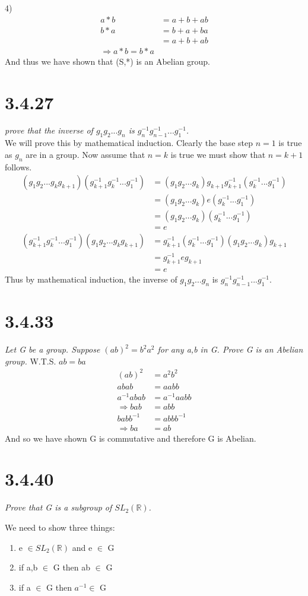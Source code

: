 \documentclass[a4paper, 11pt]{article}
\begin{document}
4)
\begin{align*}
	a \ast b &= a + b +ab \\ 
	b \ast a &= b + a +ba \\ 
	&= a + b +ab \\
	\Rightarrow a \ast b = b \ast a
\end{align*}
And thus we have shown that (S,*) is an Abelian group. 

\section*{3.4.27}
\textit{prove that the inverse of $g_1g_2...g_n$ is $g_n^{-1}g_{n-1}^{-1}...g_1^{-1}$.}\\

\noindent We will prove this by mathematical induction. Clearly the base step $n=1$ is true as $g_n$ are in a group. Now assume that $n=k$ is true we must show that $n=k+1$ follows. 
\begin{align*}
	(g_1g_2...g_kg_{k+1})(g_{k+1}^{-1}g_k^{-1}...g_1^{-1}) &=(g_1g_2...g_k)g_{k+1}g_{k+1}^{-1}(g_k^{-1}...g_1^{-1})\\
	&=(g_1g_2...g_k)e(g_k^{-1}...g_1^{-1})\\
	&=(g_1g_2...g_k)(g_k^{-1}...g_1^{-1})\\
	&= e \\
	(g_{k+1}^{-1}g_k^{-1}...g_1^{-1})(g_1g_2...g_kg_{k+1}) &=g_{k+1}^{-1}(g_k^{-1}...g_1^{-1})(g_1g_2...g_k)g_{k+1}\\
	&= g_{k+1}^{-1} e g_{k+1} \\ 
	&= e 
\end{align*}
Thus by mathematical induction, the inverse of $g_1g_2...g_n$ is $g_n^{-1}g_{n-1}^{-1}...g_1^{-1}$.

\section*{3.4.33}
\textit{Let G be a group. Suppose $(ab)^2=b^2a^2$ for any a,b in G. Prove G is an Abelian group.}
W.T.S. $ab = ba$ \\ 
\begin{align*}
	(ab)^2 &= a^2b^2 \\ 
	abab &= aabb \\ 
	a^{-1}abab &= a^{-1}aabb \\ 
	\Rightarrow bab &= abb \\ 
	babb^{-1} &= abbb^{-1} \\ 
	\Rightarrow ba &= ab
\end{align*}
And so we have shown G is commutative and therefore G is Abelian.

\section*{3.4.40}
\textit{Prove that G is a subgroup of $SL_2(\mathbb{R})$.}

We need to show three things: 

\begin{enumerate}
	\item e $\in SL_2(\mathbb{R})$ and e $\in$ G 
	\item if a,b $\in$ G then ab $\in$ G 
	\item if a $\in$ G then $a^{-1} \in$ G
\end{enumerate}
\end{document}
